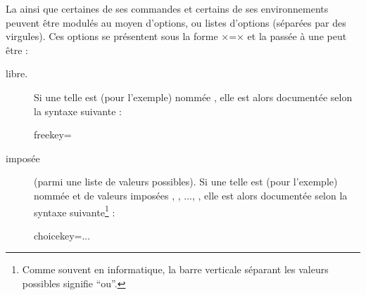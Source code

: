 La \yatcl{} ainsi que certaines de ses commandes et certains de ses
environnements peuvent être modulés au moyen d'options, ou listes d'options
(séparées par des virgules). Ces options se présentent sous la forme
×=× et la  passée à une  peut
être :
\begin{description}
\item[libre.] Si une telle  est (pour l'exemple) nommée
  , elle est alors documentée selon la syntaxe suivante :
  \begin{docKey*}{freekey}{=}{}
  \end{docKey*}
\item[imposée] (parmi une liste de valeurs possibles). Si une telle  est
   (pour l'exemple) nommée  et de valeurs imposées
  , , ..., , elle est alors
  documentée selon la syntaxe suivante\footnote{Comme souvent en informatique,
    la barre verticale séparant les valeurs possibles signifie \enquote{ou}.} :
  \begin{docKey*}{choicekey}{=\textbar{}\textbar...\textbar{}}{}
  \end{docKey*}
\end{description}

